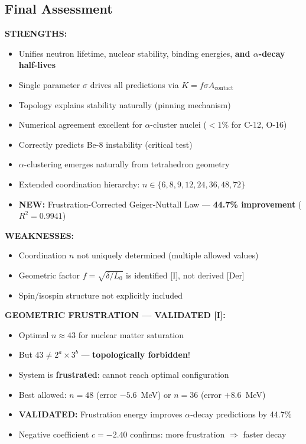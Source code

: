 \subsection{Final Assessment}
\label{subsec:m6-assessment}

\begin{tcolorbox}[colback=blue!5!white, colframe=blue!75!black, breakable, title=Topological Pinning Model: Final Verdict]

\textbf{STRENGTHS:}
\begin{itemize}
    \item Unifies neutron lifetime, nuclear stability, binding energies, \textbf{and $\alpha$-decay half-lives}
    \item Single parameter $\sigma$ drives all predictions via $K = f \sigma A_{\text{contact}}$
    \item Topology explains stability naturally (pinning mechanism)
    \item Numerical agreement excellent for $\alpha$-cluster nuclei ($<1\%$ for C-12, O-16)
    \item Correctly predicts Be-8 instability (critical test)
    \item $\alpha$-clustering emerges naturally from tetrahedron geometry
    \item Extended coordination hierarchy: $n \in \{6, 8, 9, 12, 24, 36, 48, 72\}$
    \item \textbf{NEW:} Frustration-Corrected Geiger-Nuttall Law --- \textbf{44.7\% improvement} ($R^2 = 0.9941$)
\end{itemize}

\textbf{WEAKNESSES:}
\begin{itemize}
    \item Coordination $n$ not uniquely determined (multiple allowed values)
    \item Geometric factor $f = \sqrt{\delta/L_0}$ is identified [I], not derived [Der]
    \item Spin/isospin structure not explicitly included
\end{itemize}

\textbf{GEOMETRIC FRUSTRATION --- VALIDATED [I]:}
\begin{itemize}
    \item Optimal $n \approx 43$ for nuclear matter saturation
    \item But $43 \neq 2^a \times 3^b$ --- \textbf{topologically forbidden}!
    \item System is \textbf{frustrated}: cannot reach optimal configuration
    \item Best allowed: $n = 48$ (error $-5.6$~MeV) or $n = 36$ (error $+8.6$~MeV)
    \item \textbf{VALIDATED:} Frustration energy improves $\alpha$-decay predictions by 44.7\%
    \item Negative coefficient $c = -2.40$ confirms: more frustration $\Rightarrow$ faster decay
\end{itemize}


\end{tcolorbox}
